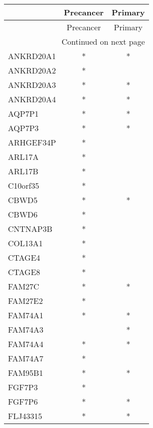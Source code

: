 \begin{longtable}{lcc}
\toprule
{} & Precancer & Primary \\
\midrule
\endfirsthead

\toprule
{} & Precancer & Primary \\
\midrule
\endhead
\midrule
\multicolumn{3}{r}{{Continued on next page}} \\
\midrule
\endfoot

\bottomrule
\endlastfoot
ANKRD20A1          &         * &       * \\
ANKRD20A2          &         * &         \\
ANKRD20A3          &         * &       * \\
ANKRD20A4          &         * &       * \\
AQP7P1             &         * &       * \\
AQP7P3             &         * &       * \\
ARHGEF34P          &         * &         \\
ARL17A             &         * &         \\
ARL17B             &         * &         \\
C10orf35           &         * &         \\
CBWD5              &         * &       * \\
CBWD6              &         * &         \\
CNTNAP3B           &         * &         \\
COL13A1            &         * &         \\
CTAGE4             &         * &         \\
CTAGE8             &         * &         \\
FAM27C             &         * &       * \\
FAM27E2            &         * &         \\
FAM74A1            &         * &       * \\
FAM74A3            &           &       * \\
FAM74A4            &         * &       * \\
FAM74A7            &         * &         \\
FAM95B1            &         * &       * \\
FGF7P3             &         * &         \\
FGF7P6             &         * &       * \\
FLJ43315           &         * &       * \\

\end{longtable}
